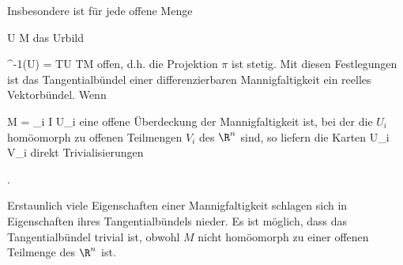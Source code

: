 Insbesondere ist für jede offene Menge

\mavergleichskette
{\vergleichskette
{ U
}
{ \subseteq }{ M
}
{  }{
}
{    }{
}
{   }{
}
}
{}{}{}
das Urbild

\mavergleichskette
{\vergleichskette
{ \pi^{-1}(U)
}
{ = }{TU
}
{ \subseteq }{TM
}
{    }{
}
{   }{
}
}
{}{}{}
offen, d.h. die Projektion $\pi$ ist stetig. Mit diesen Festlegungen ist das Tangentialbündel einer differenzierbaren Mannigfaltigkeit ein reelles Vektorbündel. Wenn

\mavergleichskettedisp
{\vergleichskette
{ M
}
{ =} { \bigcup_{i \in I} U_i
}
{ } {
}
{ } {
}
{ } {
}
}
{}{}{}
eine offene Überdeckung der Mannigfaltigkeit ist, bei der die $U_i$ homöomorph zu offenen Teilmengen $V_i$  des $\R^n$ sind, so liefern die Karten
 { U_i } { V_i
} {}
direkt Trivialisierungen

 { . }

Erstaunlich viele Eigenschaften einer Mannigfaltigkeit schlagen sich in Eigenschaften ihres Tangentialbündels nieder. Es ist möglich, dass das Tangentialbündel trivial ist, obwohl $M$ nicht homöomorph zu einer offenen Teilmenge des $\R^n$ ist.
